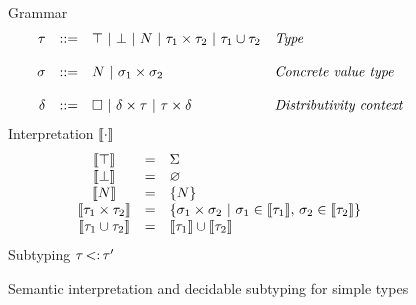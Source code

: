 \begin{figure}[t]
\footnotesize
Grammar
\[\begin{array}{rcll}
    \tau &::=& 
        \top ~\vert~ \bot ~\vert~ N ~\vert~
        \tau_1 \times \tau_2 ~\vert~ \tau_1 \cup \tau_2
        & \textit{Type} \\
    \\
    \sigma &::=& 
        N ~\vert~
        \sigma_1 \times \sigma_2
        & \textit{Concrete value type} \\
    \\
    \delta &::=& \square ~\vert~
        \delta \times \tau ~\vert~ \tau \times \delta 
        & \textit{Distributivity context} \\
\end{array}\]
Interpretation $\llbracket \cdot \rrbracket$
\[
    \begin{array}{ccl}
        \interp{\tyany} &=& \Sigma \\
        \interp{\tybot} &=& \varnothing \\
        \interp{\iname} &=& \{ \iname \} \\
        \interp{\typair{\ty_1}{\ty_2}} &=& 
            \{ \typair{\gty_1}{\gty_2} \ | \ 
            \gty_1 \in \interp{\ty_1},\,\gty_2 \in \interp{\ty_2} \} \\
        \interp{\tyunion{\ty_1}{\ty_2}} &=& 
            \interp{\ty_1} \cup \interp{\ty_2} \\
    \end{array}
\]
Subtyping $\tau \operatorname{<:} \tau'$\\
\caption{Semantic interpretation and decidable subtyping for simple types
}\label{fig:sem:ty-simple}
\end{figure}

